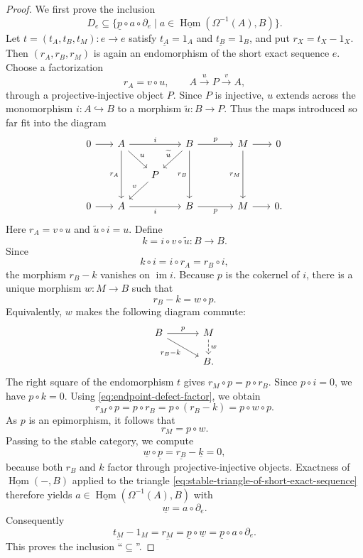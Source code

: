 \documentclass[a4paper,11pt,reqno]{amsart}
\theoremstyle{definition}
\theoremstyle{plain}
\numberwithin{equation}{section}
\newcommand{\Hom}{\operatorname{Hom}}
\begin{document}
\begin{proof}
We first prove the inclusion
\[
 D_e\subseteq
 \bigl\{
 \underline p\circ a\circ\partial_e
 \mid
 a\in\underline{\Hom}(\Omega^{-1}(A),B)
 \bigr\}.
\]
Let \(t=(t_A,t_B,t_M):e\to e\) satisfy
\(\underline{t_A}=1_A\) and \(\underline{t_B}=1_B\), and put
\(r_X=t_X-1_X\).  Then
\((r_A,r_B,r_M)\) is again an endomorphism of the short exact sequence
\(e\).  Choose a factorization
\[
 r_A=v\circ u,
 \qquad
 A\xrightarrow{u}P\xrightarrow{v}A,
\]
through a projective-injective object \(P\).  Since \(P\) is injective,
\(u\) extends across the monomorphism \(i:A\hookrightarrow B\) to a morphism
\(\widetilde u:B\to P\).  Thus the maps introduced so far fit into the diagram
\begin{equation*}
\begin{tikzcd}[column sep=1.8em,row sep=1.7em]
0\arrow[r]&
A\arrow[rr,"i"]\arrow[dd,"r_A"']\arrow[dr,"u"]&&
B\arrow[rr,"p"]\arrow[dd,"r_B"']\arrow[dl,"\widetilde u"']&&
M\arrow[r]\arrow[dd,"r_M"']&0\\
&&P\arrow[dl,"v"']&&&&\\
0\arrow[r]&
A\arrow[rr,"i"']&&
B\arrow[rr,"p"']&&
M\arrow[r]&0.
\end{tikzcd}
\end{equation*}
Here \(r_A=v\circ u\) and \(\widetilde u\circ i=u\).
Define
\[
 k=i\circ v\circ\widetilde u:B\longrightarrow B.
\]
Since
\[
 k\circ i=i\circ r_A=r_B\circ i,
\]
the morphism \(r_B-k\) vanishes on \(\operatorname{im}i\).  Because
\(p\) is the cokernel of \(i\), there is a unique morphism
\(w:M\to B\) such that
\begin{equation}
\label{eq:endpoint-defect-factor}
 r_B-k=w\circ p.
\end{equation}
Equivalently, \(w\) makes the following diagram commute:
\begin{equation*}
\begin{tikzcd}[column sep=3.2em,row sep=1.5em]
B\arrow[r,"p"]\arrow[dr,"r_B-k"']&M\arrow[d,dashed,"w"]\\
&B.
\end{tikzcd}
\end{equation*}
The right square of the endomorphism \(t\) gives
\(r_M\circ p=p\circ r_B\).  Since \(p\circ i=0\), we have
\(p\circ k=0\).  Using \eqref{eq:endpoint-defect-factor}, we obtain
\[
 r_M\circ p=p\circ r_B
 =p\circ(r_B-k)=p\circ w\circ p.
\]
As \(p\) is an epimorphism, it follows that
\[
 r_M=p\circ w.
\]
Passing to the stable category, we compute
\[
 \underline w\circ\underline p
 =\underline{r_B}-\underline k=0,
\]
because both \(r_B\) and \(k\) factor through projective-injective
objects.  Exactness of \(\underline{\Hom}(-,B)\) applied to the triangle
\eqref{eq:stable-triangle-of-short-exact-sequence} therefore yields
\(a\in\underline{\Hom}(\Omega^{-1}(A),B)\) with
\[
 \underline w=a\circ\partial_e.
\]
Consequently
\[
 \underline{t_M}-1_M
 =\underline{r_M}
 =\underline p\circ\underline w
 =\underline p\circ a\circ\partial_e.
\]
This proves the inclusion ``\(\subseteq\)''.


\end{proof}
\end{document}
